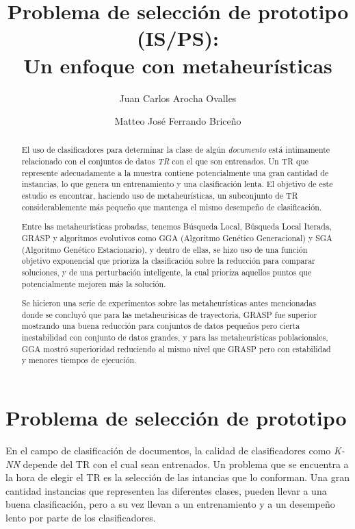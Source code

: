 \documentclass{ci5652}
\title{Problema de selección de prototipo (IS/PS):\\
       Un enfoque con metaheurísticas}
\author{Juan Carlos Arocha Ovalles
        \and
        Matteo José Ferrando Briceño}
\begin{document}
\thispagestyle{empty}
\maketitle


\begin{abstract}
El uso de clasificadores para determinar la clase de algún \textit{documento} está intimamente relacionado con el conjuntos de datos \textit{TR} con el que son entrenados. Un TR que represente adecuadamente a la muestra contiene potencialmente una gran cantidad de instancias, lo que genera un entrenamiento y una clasificación lenta. El objetivo de este estudio es encontrar, haciendo uso de metaheurísticas, un subconjunto de TR considerablemente más pequeño que mantenga el mismo desempeño de clasificación.

Entre las metaheurísticas probadas, tenemos Búsqueda Local, Búsqueda Local Iterada, GRASP y algoritmos evolutivos como GGA (Algoritmo Genético Generacional) y SGA (Algoritmo Genético Estacionario), y  dentro de ellas, se hizo uso de una función objetivo exponencial que prioriza la clasificación sobre la reducción para comparar soluciones, y de una perturbación inteligente, la cual prioriza aquellos puntos que potencialmente mejoren más la solución.

Se hicieron una serie de experimentos sobre las metaheurísticas antes mencionadas donde se concluyó que para las metaheurísicas de trayectoria, GRASP fue superior mostrando una buena reducción para conjuntos de datos pequeños pero cierta inestabilidad con conjunto de datos grandes, y para las metaheurísticas poblacionales, GGA mostró superioridad reduciendo al mismo nivel que GRASP pero con estabilidad y menores tiempos de ejecución.

\end{abstract}

\section{Problema de selección de prototipo}

En el campo de clasificación de documentos, la calidad de clasificadores como \textit{K-NN} depende del TR con el cual sean entrenados. Un problema que se encuentra a la hora de elegir el TR es la selección de las intancias que lo conforman. Una gran cantidad instancias que representen las diferentes clases, pueden llevar a una buena clasificación, pero a su vez llevan a un entrenamiento y a un desempeño lento por parte de los clasificadores.
\end{document}
